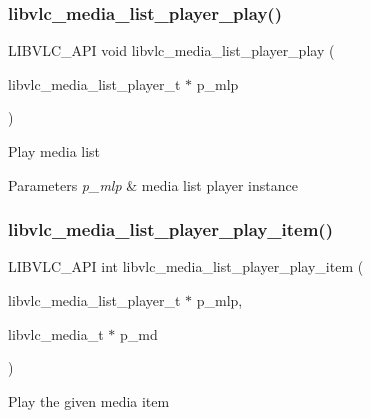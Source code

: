 \subsubsection{\texorpdfstring{libvlc\+\_\+media\+\_\+list\+\_\+player\+\_\+play()}{libvlc\_media\_list\_player\_play()}}
{\footnotesize\ttfamily L\+I\+B\+V\+L\+C\+\_\+\+A\+PI void libvlc\+\_\+media\+\_\+list\+\_\+player\+\_\+play (\begin{DoxyParamCaption}\item[{libvlc\+\_\+media\+\_\+list\+\_\+player\+\_\+t $\ast$}]{p\+\_\+mlp }\end{DoxyParamCaption})}

Play media list


\begin{DoxyParams}{Parameters}
{\em p\+\_\+mlp} & media list player instance \\
\hline
\end{DoxyParams}
\mbox{\label{group__libvlc__media__list__player_ga37a259c6a4216de2a6dca317eab97156}} 
\subsubsection{\texorpdfstring{libvlc\+\_\+media\+\_\+list\+\_\+player\+\_\+play\+\_\+item()}{libvlc\_media\_list\_player\_play\_item()}}
{\footnotesize\ttfamily L\+I\+B\+V\+L\+C\+\_\+\+A\+PI int libvlc\+\_\+media\+\_\+list\+\_\+player\+\_\+play\+\_\+item (\begin{DoxyParamCaption}\item[{libvlc\+\_\+media\+\_\+list\+\_\+player\+\_\+t $\ast$}]{p\+\_\+mlp,  }\item[{libvlc\+\_\+media\+\_\+t $\ast$}]{p\+\_\+md }\end{DoxyParamCaption})}

Play the given media item


